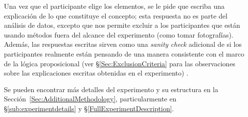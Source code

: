 \begin{enumerate}
	Una vez que el participante elige los elementos, se le pide que escriba una explicación de lo que constituye el concepto; esta respuesta no es parte del análisis de datos, excepto que nos permite excluir a los participantes que están usando métodos fuera del alcance del experimento (como tomar fotografías). Además, las respuestas escritas sirven como una {\em sanity check} adicional de si los participantes realmente están pensando de una manera consistente con el marco de la lógica proposicional (ver \S\ref{Sec:ExclusionCriteria} para las observaciones sobre las explicaciones escritas obtenidas en el experimento) .
\end{enumerate}

Se pueden encontrar más detalles del experimento y su estructura en la Sección~\ref{Sec:AdditionalMethodology}, particularmente en \S\ref{sub:experimentdetails} y \S\ref{FullExperimentDescription}. 

